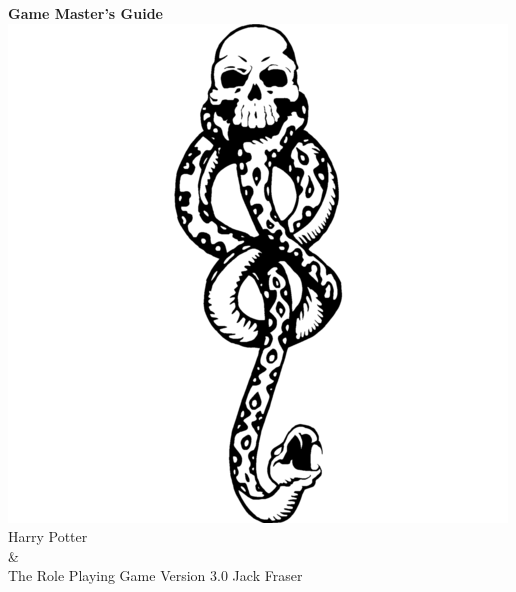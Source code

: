 \documentclass[oneside]{book}
\begin{document}
\begin{titlepage}
    \centering
    \vfill
    {\bfseries
        {\HP \fontsize{40}{35}\selectfont Game Master's Guide}
    }    
    \vfill
    \includegraphics[scale = 0.65]{../Images/snake} %
    \vfill
    {\HP \fontsize{30}{24} \selectfont  Harry Potter \\\&\\ The Role Playing Game}
    \normalsize
    \vfill
    {\HP \fontsize{22}{0} \selectfont Version 3.0 \hfill Jack Fraser}
\end{titlepage}

\footnotesize
\tableofcontents
\normalsize









\end{document}
